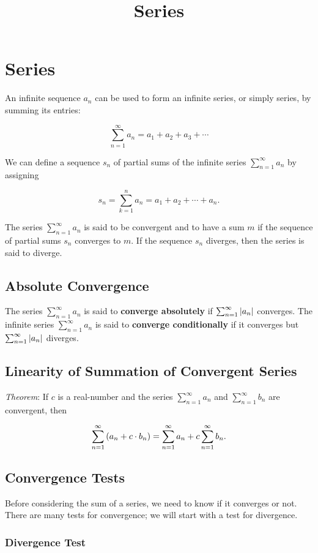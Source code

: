 \documentclass{article}
\title{Series}
\begin{document}
\section{Series}

An infinite \@{sequence} $a_n$ can be used to form an infinite series, or simply series, by summing its entries:

\[ \sum_{n=1}^{\infty} a_n = a_1 + a_2 + a_3 + \cdots \]

We can define a sequence $s_n$ of partial sums of the infinite series $\sum_{n=1}^{\infty}{a_n}$ by assigning

\[ s_n = \sum_{k=1}^{n} a_n = a_1 + a_2 + \cdots + a_n. \]

The series $\sum_{n=1}^{\infty}{a_n}$ is said to be convergent and to have a sum $m$ if the sequence of partial sums $s_n$ \@{converges} to $m.$ If the sequence $s_n$ \@{diverges}, then the series is said to diverge.

\subsection{Absolute Convergence}
The series $\sum_{n=1}^{\infty}{a_n}$ is said to \textbf{converge absolutely} if $\sum_{n=1}^{\infty}{\left| a_n \right|}$ converges. The infinite series $\sum_{n=1}^{\infty}{a_n}$ is said to \textbf{converge conditionally} if it converges but $\sum_{n=1}^{\infty}{\left| a_n \right|}$ diverges.

\subsection{Linearity of Summation of Convergent Series}

\emph{Theorem}: If $c$ is a \@{real-number} and the series $\sum_{n=1}^{\infty}{a_n}$ and $\sum_{n=1}^{\infty}{b_n}$ are convergent, then

\[ \sum_{n=1}^{\infty}{ \left(a_n + c \cdot b_n\right)} =  \sum_{n=1}^{\infty}{a_n} + c \sum_{n=1}^{\infty}{b_n}. \]

\subsection{Convergence Tests}

Before considering the sum of a series, we need to know if it converges or not. There are many tests for convergence; we will start with a test for divergence.

\subsubsection{Divergence Test}
\end{document}
